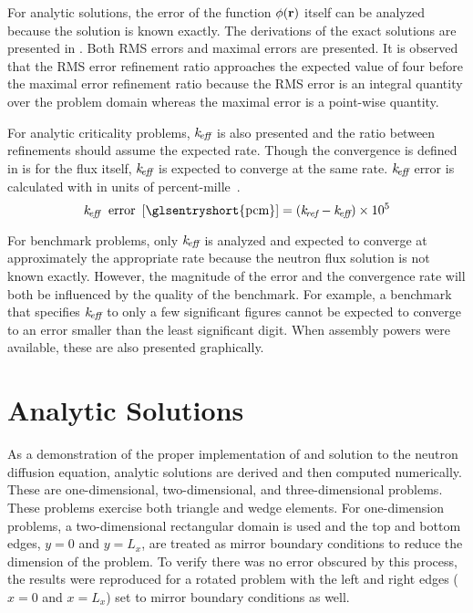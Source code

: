   For analytic solutions, the error of the function $\phi(\mathbf{r})$ itself can be 
  analyzed because the solution is known exactly. The derivations of the exact 
  solutions are presented in . Both RMS errors and
  maximal errors are presented. It is observed that the RMS error refinement
  ratio approaches the expected value of four before the maximal error
  refinement ratio because the RMS error is an integral quantity over the
  problem domain whereas the maximal error is a point-wise quantity.

  For analytic criticality  problems, $k_{\!\mbox{\scriptsize \em eff}}$ is also presented and the ratio
  between refinements should assume the expected rate. Though the convergence is
  defined in  is for the flux itself, $k_{\!\mbox{\scriptsize \em eff}}$ is expected
  to  converge at the same rate.  $k_{\!\mbox{\scriptsize \em eff}}$ error is calculated with
   in units of percent-mille~.
  \begin{equation}
    \label{eq:keff_err}
    \keff \; \text{ error } \units{\glsentryshort{pcm}} = (\kref - \keff) 
      \times 10^5
  \end{equation}

  For benchmark problems, only $k_{\!\mbox{\scriptsize \em eff}}$ is analyzed and expected to converge
  at approximately the appropriate rate because the neutron flux solution is not 
  known exactly. However, the magnitude of the error and the convergence rate
  will both be influenced by the quality of the benchmark. For example, a
  benchmark that specifies $k_{\!\mbox{\scriptsize \em eff}}$ to only a few significant figures cannot be 
  expected to converge to an error smaller than the least significant digit. 
  When assembly powers were available, these are also presented graphically. 
  \def\Put(#1,#2)#3{\leavevmode\makebox(0,0){\put(#1,#2){#3}}}

\section{Analytic Solutions}
  As a demonstration of the proper implementation of and solution to the 
  neutron diffusion equation, analytic solutions are derived and then 
  computed numerically. These are one-dimensional, two-dimensional, and 
  three-dimensional problems. These problems exercise both triangle and wedge 
  elements. For one-dimension problems, a two-dimensional rectangular domain is
  used and the top and bottom edges, $y=0$ and $y=L_x$, are treated as mirror 
  boundary conditions to reduce the dimension of the problem. To verify there
  was no error obscured by this process, the results were reproduced for a 
  rotated problem with the left and right edges ($x=0$ and $x=L_x$) set to
  mirror boundary conditions as well.

